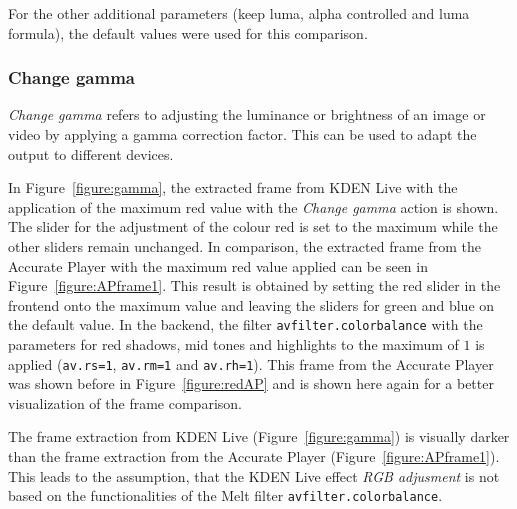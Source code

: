 \documentclass[../MasterThesis.tex]{subfiles}
\begin{document}
For the other additional parameters (keep luma, alpha controlled and luma formula), the default values were used for this comparison.












\subsubsection*{Change gamma}

\textit{Change gamma} refers to adjusting the luminance or brightness of an image or video by applying a gamma correction factor. This can be used to adapt the output to different devices.~\cite{gamma}

In Figure~\ref{figure:gamma}, the extracted frame from KDEN Live with the application of the maximum red value with the \textit{Change gamma} action is shown. The slider for the adjustment of the colour red is set to the maximum while the other sliders remain unchanged.
In comparison, the extracted frame from the Accurate Player with the maximum red value applied can be seen in Figure~\ref{figure:APframe1}. This result is obtained by setting the red slider in the frontend onto the maximum value and leaving the sliders for green and blue on the default value. In the backend, the filter \texttt{avfilter.colorbalance} with the parameters for red shadows, mid tones and highlights to the maximum of $1$ is applied (\texttt{av.rs=1}, \texttt{av.rm=1} and \texttt{av.rh=1}).
This frame from the Accurate Player was shown before in Figure~\ref{figure:redAP} and is shown here again for a better visualization of the frame comparison.

The frame extraction from KDEN Live (Figure~\ref{figure:gamma}) is visually darker than the frame extraction from the Accurate Player (Figure~\ref{figure:APframe1}). This leads to the assumption, that the KDEN Live effect \textit{RGB adjusment} is not based on the functionalities of the Melt filter \texttt{avfilter.colorbalance}.
\end{document}
